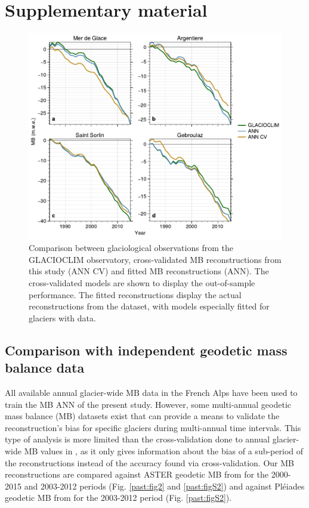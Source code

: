 {\section{Supplementary material}

\begin{figure}[h]
\centering
\includegraphics[width=12cm]{Figures/past/Figure_S1.pdf}
\captionsetup{justification=centering}
\caption{Comparison between glaciological observations from the GLACIOCLIM observatory, cross-validated MB reconstructions from this study (ANN CV) and fitted MB reconstructions (ANN). The cross-validated models are shown to display the out-of-sample performance. The fitted reconstructions display the actual reconstructions from the dataset, with models especially fitted for glaciers with data.}
\label{past:figS1}
\end{figure}


\subsection{Comparison with independent geodetic mass balance data} \label{past:supp:comparison}

All available annual glacier-wide MB data in the French Alps have been used to train the MB ANN of the present study. However, some multi-annual geodetic mass balance (MB) datasets exist that can provide a means to validate the reconstruction's bias for specific glaciers during multi-annual time intervals. This type of analysis is more limited than the cross-validation done to annual glacier-wide MB values in \cite{bolibar_deep_2020-1}, as it only gives information about the bias of a sub-period of the reconstructions instead of the accuracy found via cross-validation. Our MB reconstructions are compared against ASTER geodetic MB from \citet{davaze_region-wide_2020} for the 2000-2015 and 2003-2012 periods (Fig. \ref{past:fig2} and \ref{past:figS2}) and against Pléiades geodetic MB from \citet{berthier_glacier_2014} for the 2003-2012 period (Fig. \ref{past:figS2}).

}
